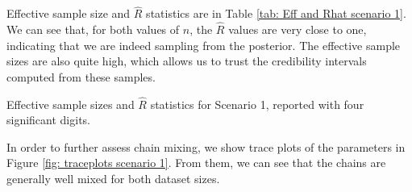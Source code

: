 \documentclass[a4paper, 10pt]{article}
\begin{document}
Effective sample size and $ \hat{ R } $ statistics are in Table \ref{tab: Eff and Rhat scenario 1}.
We can see that, for both values of $ n $, the $ \hat{ R } $ values are very close to one, indicating that we are indeed sampling from the posterior.
The effective sample sizes are also quite high, which allows us to trust the credibility intervals computed from these samples.
\begin{table}[htb]
    \centering
    
    \quad
    
    \caption{Effective sample sizes and $ \hat{ R } $ statistics for Scenario 1, reported with four significant digits.}
    \label{tab: Eff and Rhat scenario 1}
\end{table}
In order to further assess chain mixing, we show trace plots of the parameters in Figure \ref{fig: traceplots scenario 1}.
From them, we can see that the chains are generally well mixed for both dataset sizes.
\end{document}
